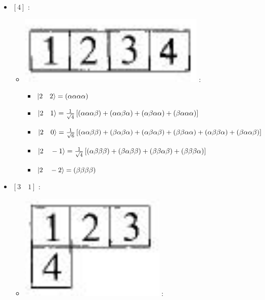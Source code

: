 \documentclass[12pt,a4paper]{article}
\begin{document}
\begin{itemize}
\item $\left[ 4\right]$ :
\begin{itemize}
\item \includegraphics[scale=0.2]{build/young-4.png} : 
\begin{itemize}[label=$\ast$]
\item $\ket{2\quad2} = \left( \alpha \alpha \alpha\alpha\right)$ 
\item $\ket{2 \quad 1} = \frac{1}{\sqrt{4}} \left[
\left( \alpha\alpha\alpha\beta\right) + \left(\alpha \alpha\beta \alpha \right) 
+ \left(\alpha\beta\alpha \alpha\right) + \left( \beta\alpha \alpha\alpha\right) 
 \right]$ 
 \item  $\ket{2\quad 0} =\frac{1}{\sqrt{6}} \left[ 
\left(\alpha \alpha \beta \beta \right) + \left( \beta \alpha\beta \alpha \right) +
\left(\alpha\beta\alpha\beta \right) + \left(\beta \beta \alpha\alpha \right) +
\left( \alpha\beta\beta \alpha\right) + \left( \beta \alpha\alpha\beta\right) 
 \right]$ 
 \item  $\ket{2\quad -1} = \frac{1}{\sqrt{4}}  \left[ 
\left( \alpha\beta\beta\beta\right) + \left( \beta\alpha\beta\beta \right)  + 
\left( \beta\beta\alpha\beta \right) + \left( \beta \beta \beta \alpha\right) 
 \right]$
 \item $\ket{2\quad -2} = \left( \beta \beta \beta \beta \right) $
\end{itemize}
\end{itemize}
\item  $\left[ 3\quad 1\right]$ :
\begin{itemize}
\item  \includegraphics[scale=0.2]{build/young-31-123.png} : 

\end{itemize}
\end{itemize}
\end{document}
